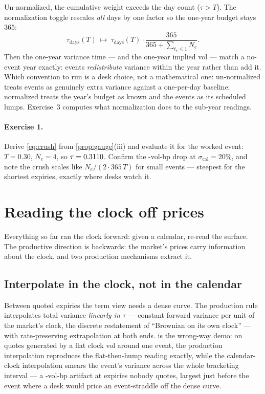 \documentclass[11pt]{article}
\begin{document}
Un-normalized, the cumulative weight exceeds the day count
($\tau>T$).  The normalization toggle rescales \emph{all} days by one
factor so the one-year budget stays $365$:
\begin{equation}
\tau_{\mathrm{days}}(T)\ \longmapsto\
\tau_{\mathrm{days}}(T)\cdot\frac{365}{365+\sum_{t_e\le1}N_e} .
\label{eq:normalize}
\end{equation}
Then the one-year variance time --- and the one-year implied vol ---
match a no-event year exactly: events \emph{redistribute} variance
within the year rather than add it.  Which convention to run is a desk
choice, not a mathematical one: un-normalized treats events as
genuinely extra variance against a one-per-day baseline; normalized
treats the year's budget as known and the events as its scheduled
lumps.  Exercise~3 computes what normalization does to the sub-year
readings.

\paragraph{Exercise 1.}
Derive \eqref{eq:crush} from \cref{prop:gauge}(iii) and evaluate it for
the worked event: $T=0.30$, $N_e=4$, so
$\tau=0.3110$.  Confirm the \emcdropbp-vol-bp drop at
$\sigma_{\mathrm{cal}}=20\%$, and note the crush scales like
$N_e/(2\cdot365\,T)$ for small events --- steepest for the shortest
expiries, exactly where desks watch it.

\section{Reading the clock off prices}
\label{sec:read}

Everything so far ran the clock forward: given a calendar, re-read the
surface.  The productive direction is backwards: the market's prices
carry information about the clock, and two production mechanisms
extract it.

\subsection{Interpolate in the clock, not in the calendar}

Between quoted expiries the term view needs a dense curve.  The
production rule interpolates total variance \emph{linearly in $\tau$}
--- constant forward variance per unit of the market's clock, the
discrete restatement of ``Brownian on its own clock'' --- with
rate-preserving extrapolation at both ends.   is the
wrong-way demo: on quotes generated by a flat clock vol around one
event, the production interpolation reproduces the flat-then-hump
reading exactly, while the calendar-clock interpolation smears the
event's variance across the whole bracketing interval --- a
\emcinterpgapbp-vol-bp artifact at expiries nobody quotes, largest just
before the event where a desk would price an event-straddle off the
dense curve.
\end{document}
